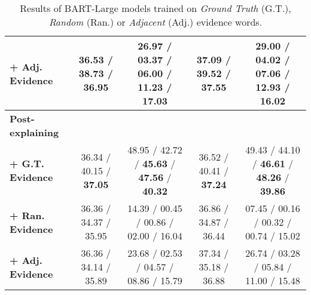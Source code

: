 \begin{table*}[tp!]
{\begin{tabular}{lcccc}
\hspace{0.3cm} \textbf{+ Adj. Evidence}  &
36.53 / 38.73 / 36.95  &
26.97 / 03.37 / 06.00 / 11.23 / 17.03  &
37.09 / 39.52 / 37.55  &
29.00 / 04.02 / 07.06 / 12.93 / 16.02  \\

\hline 

\textbf{Post-explaining}  \\

\hspace{0.3cm} \textbf{+ G.T. Evidence}  &
36.34 / 40.15 / \textbf{37.05}  &
48.95 / 42.72 / \textbf{45.63} / \textbf{47.56} / \textbf{40.32}  &
36.52 / 40.41 / \textbf{37.24}  &
49.43 / 44.10 / \textbf{46.61} / \textbf{48.26} / \textbf{39.86}  \\

\hspace{0.3cm} \textbf{+ Ran. Evidence}  &
36.36 / 34.37 / 35.95  &
14.39 / 00.45 / 00.86 / 02.00 / 16.04  &
36.86 / 34.87 / 36.44  &
07.45 / 00.16 / 00.32 / 00.74 / 15.02  \\

\hspace{0.3cm} \textbf{+ Adj. Evidence}  &
36.36 / 34.14 / 35.89  &
23.68 / 02.53 / 04.57 / 08.86 / 15.79  &
37.34 / 35.18 / 36.88  &
26.74 / 03.28 / 05.84 / 11.00 / 15.48  \\

\bottomrule

\end{tabular}}
\caption{Results of BART-Large models trained on \textit{Ground Truth} (G.T.), \textit{Random} (Ran.) or \textit{Adjacent} (Adj.) evidence words.}
\label{tab:exp_synthesize}
\end{table*}
